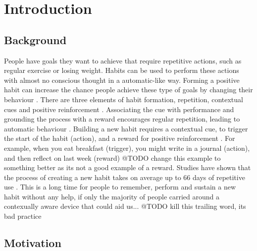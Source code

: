 
\section{Introduction}

\subsection*{Background}
People have goals they want to achieve that require repetitive actions, such as regular exercise or losing weight. Habits can be used to perform these actions with almost no conscious thought in a automatic-like way. Forming a positive habit can increase the chance people achieve these type of goals by changing their behaviour \cite{article_promoting_habit_formation}. There are three elements of habit formation, repetition, contextual cues and positive reinforcement \cite{article_beyond_self_tracking_designing_apps}. Associating the cue with performance and grounding the process with a reward encourages regular repetition, leading to automatic behaviour \cite{article_experiences_of_habit_formation}. Building a new habit requires a contextual cue, to trigger the start of the habit (action), and a reward for positive reinforcement \cite{article_beyond_self_tracking_designing_apps, article_how_habits_formed_modelling_habit_formation}. For example, when you eat breakfast (trigger), you might write in a journal (action), and then reflect on last week (reward) @TODO change this example to something better as its not a good example of a reward. Studies have shown that the process of creating a new habit takes on average up to 66 days of repetitive use \cite{article_how_habits_formed_modelling_habit_formation}. This is a long time for people to remember, perform and sustain a new habit without any help, if only the majority of people carried around a contexually aware device that could aid us... @TODO kill this trailing word, its bad practice

\subsection*{Motivation}

